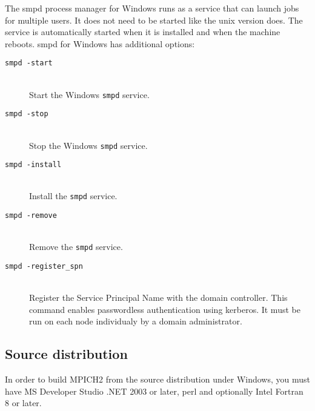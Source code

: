 \documentclass[dvipdfm,11pt]{article}
\begin{document}
The smpd process manager for Windows runs as a service that can launch jobs 
for multiple users.  It does not need to be started like the unix version 
does.  The service is automatically started when it is installed and when 
the machine reboots.  smpd for Windows has additional options:
\begin{description}
\item[\texttt{smpd -start}]\mbox{}\\
Start the Windows \texttt{smpd} service.
\item[\texttt{smpd -stop}]\mbox{}\\
Stop the Windows \texttt{smpd} service.
\item[\texttt{smpd -install}]\mbox{}\\
Install the \texttt{smpd} service.
\item[\texttt{smpd -remove}]\mbox{}\\
Remove the \texttt{smpd} service.
\item[\texttt{smpd -register\_spn}]\mbox{}\\
Register the Service Principal Name with the domain controller.
This command enables passwordless authentication using kerberos.  It must be 
run on each node individualy by a domain administrator.
\end{description}

\subsection{Source distribution}
\label{sec:winsrc}

In order to build MPICH2 from the source distribution under Windows, 
you must have MS Developer Studio .NET 2003 or later, perl and optionally 
Intel Fortran 8 or later.
\end{document}
